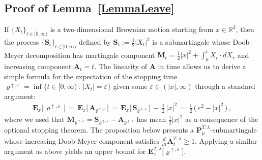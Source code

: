 \documentclass[10pt]{article}
\numberwithin{equation}{section}
\theoremstyle{definition}
\newcommand{\R}{{\mathbb R}}
\begin{document}
\subsection{Proof of Lemma~\ref{LemmaLeave}} \label{SubsectionLemmaLeave}



If $\{X_t\}_{t\in [0,\infty)}$ is a  two-dimensional Brownian motion starting from $x\in \R^2$, then the process  $\{\mathbf{S}_t\}_{t\in [0,\infty)}$ defined by  $\mathbf{S}_t:=\frac{1}{2}|X_t|^2$ is a submartingale whose Doob-Meyer decomposition has martingale component $\mathbf{M}_t=\frac{1}{2}|x|^2+\int_0^t X_r\cdot dX_r$ and increasing component    $\mathbf{A}_t=t$.
The linearity of $\mathbf{A}$ in time  allows us to derive a simple formula for the expectation of the stopping time  $\varrho^{\uparrow,\varepsilon}=\inf\{t\in [0,\infty)\,:\,|X_t|=\varepsilon \}  $ given some $\varepsilon\in (|x|,\infty)$  through a standard argument:
\begin{align}\label{BasicVarrho}
\mathbf{E}_x\big[\,\varrho^{\uparrow,\varepsilon}\,\big]\,=\,\mathbf{E}_x\big[\,\mathbf{A}_{\varrho^{\uparrow,\varepsilon}}\,\big]\,=\,\mathbf{E}_x\big[\,\mathbf{S}_{\varrho^{\uparrow,\varepsilon}}\,\big]\,-\,\frac{1}{2}\,|x|^2\,=\,\frac{1}{2}\,\big(\,\varepsilon^2-|x|^2\,\big) \,,
\end{align}
where we used that $ \mathbf{M}_{\varrho^{\uparrow,\varepsilon}}=\mathbf{S}_{\varrho^{\uparrow,\varepsilon}}-\mathbf{A}_{\varrho^{\uparrow,\varepsilon}}$ has mean $\frac{1}{2}|x|^2$ as a consequence of the optional stopping theorem.
The proposition below presents a $\mathbf{P}_{\mu}^{T,\lambda}$-submartingale whose increasing Doob-Meyer component satisfies $\frac{d}{dt}\mathbf{A}^{T,\lambda }_t\geq 1$.  Applying a similar argument as above yields  an upper bound for $\mathbf{E}_x^{T,\lambda}\big[\varrho^{\uparrow,\varepsilon}\big]$.  
\end{document}
